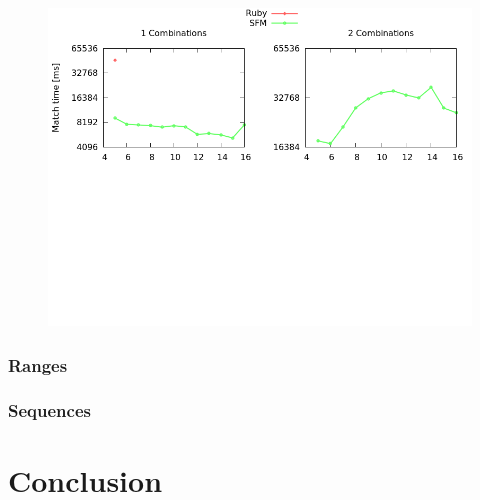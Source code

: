 \documentclass[12pt]{article}
\theoremstyle{definition}
\begin{document}
\begin{figure}[H]
	\begin{center}
		\includegraphics[scale=0.55]{graphs/seq_length_combinations.png}	
	\end{center}
	\caption{}
	\label{graph:cases:combinations}
\end{figure}

\subsubsection{Ranges}

\begin{figure}[H]
	\begin{center}
	\end{center}
	\caption{}
	\label{graph:cases:ranges}
\end{figure}


\subsubsection{Sequences}

\begin{figure}[H]
	\begin{center}
	\end{center}
	\caption{}
	\label{graph:cases:sequences}
\end{figure}


\section{Conclusion}
\end{document}

